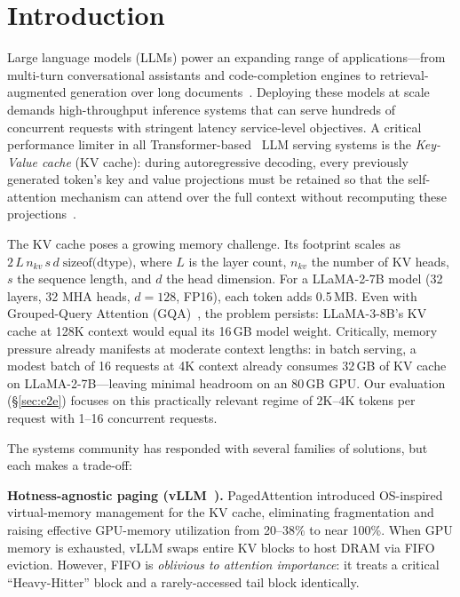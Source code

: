 \documentclass[conference]{IEEEtran}
\begin{document}
\section{Introduction}

Large language models (LLMs) power an expanding range of applications---from multi-turn conversational assistants and code-completion engines to retrieval-augmented generation over long documents~\cite{llama2,llama3}. Deploying these models at scale demands high-throughput inference systems that can serve hundreds of concurrent requests with stringent latency service-level objectives. A critical performance limiter in all Transformer-based~\cite{transformer} LLM serving systems is the \emph{Key-Value cache} (KV cache): during autoregressive decoding, every previously generated token's key and value projections must be retained so that the self-attention mechanism can attend over the full context without recomputing these projections~\cite{vllm}.


The KV cache poses a growing memory challenge. Its footprint scales as $2\,L\,n_{kv}\,s\,d\;\text{sizeof(dtype)}$, where $L$ is the layer count, $n_{kv}$ the number of KV heads, $s$ the sequence length, and $d$ the head dimension. For a LLaMA-2-7B model (32 layers, 32 MHA heads, $d{=}128$, FP16), each token adds 0.5\,MB. Even with Grouped-Query Attention (GQA)~\cite{gqa}, the problem persists: LLaMA-3-8B's KV cache at 128K context would equal its 16\,GB model weight. Critically, memory pressure already manifests at moderate context lengths: in batch serving, a modest batch of 16 requests at 4K context already consumes 32\,GB of KV cache on LLaMA-2-7B---leaving minimal headroom on an 80\,GB GPU. Our evaluation (\S\ref{sec:e2e}) focuses on this practically relevant regime of 2K--4K tokens per request with 1--16 concurrent requests.

The systems community has responded with several families of solutions, but each makes a trade-off:

\textbf{Hotness-agnostic paging (vLLM~\cite{vllm}).} PagedAttention introduced OS-inspired virtual-memory management for the KV cache, eliminating fragmentation and raising effective GPU-memory utilization from 20--38\% to near 100\%. When GPU memory is exhausted, vLLM swaps entire KV blocks to host DRAM via FIFO eviction. However, FIFO is \emph{oblivious to attention importance}: it treats a critical ``Heavy-Hitter'' block and a rarely-accessed tail block identically.
\end{document}
